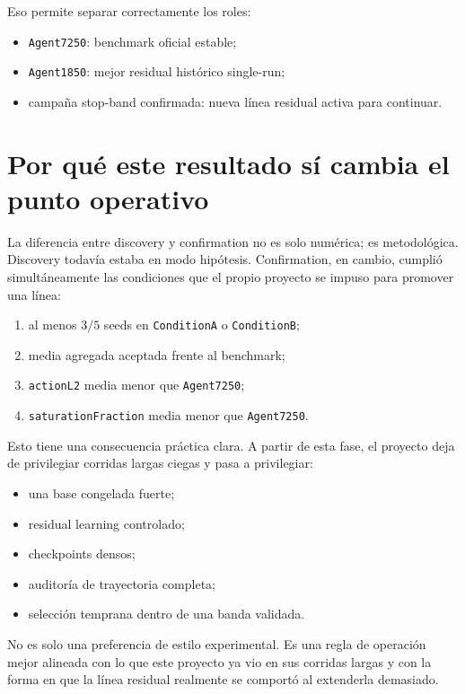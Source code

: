 \documentclass[11pt,a4paper]{article}
\begin{document}
Eso permite separar correctamente los roles:
\begin{itemize}
\item \texttt{Agent7250}: benchmark oficial estable;
\item \texttt{Agent1850}: mejor residual hist\'orico single-run;
\item campa\~na stop-band confirmada: nueva l\'inea residual activa para continuar.
\end{itemize}

\section*{Por qu\'e este resultado s\'i cambia el punto operativo}
La diferencia entre discovery y confirmation no es solo num\'erica; es metodol\'ogica. Discovery todav\'ia estaba en modo hip\'otesis. Confirmation, en cambio, cumpli\'o simult\'aneamente las condiciones que el propio proyecto se impuso para promover una l\'inea:
\begin{enumerate}
\item al menos \(3/5\) seeds en \texttt{ConditionA} o \texttt{ConditionB};
\item media agregada aceptada frente al benchmark;
\item \texttt{actionL2} media menor que \texttt{Agent7250};
\item \texttt{saturationFraction} media menor que \texttt{Agent7250}.
\end{enumerate}

Esto tiene una consecuencia pr\'actica clara. A partir de esta fase, el proyecto deja de privilegiar corridas largas ciegas y pasa a privilegiar:
\begin{itemize}
\item una base congelada fuerte;
\item residual learning controlado;
\item checkpoints densos;
\item auditor\'ia de trayectoria completa;
\item selecci\'on temprana dentro de una banda validada.
\end{itemize}

No es solo una preferencia de estilo experimental. Es una regla de operaci\'on mejor alineada con lo que este proyecto ya vio en sus corridas largas y con la forma en que la l\'inea residual realmente se comport\'o al extenderla demasiado.
\end{document}

